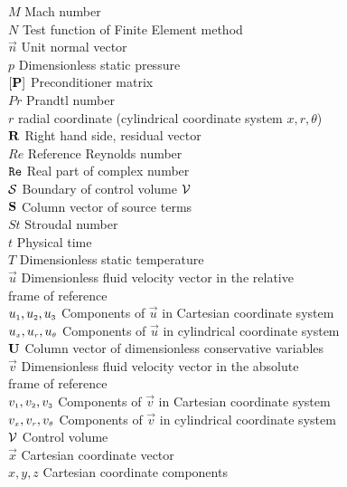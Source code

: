 \begin{tabbing}
$M$                    \> Mach number\\
$N$                    \> Test function of Finite Element method\\
$\vec{n}$              \> Unit normal vector\\
$p$                    \> Dimensionless static pressure\\
$\left[{\bf P}\right]$ \> Preconditioner matrix\\
$Pr$                   \> Prandtl number\\
$r$                    \> radial coordinate (cylindrical coordinate system $x, r, \theta$)\\
${\bf R}$              \> Right hand side, residual vector\\
$Re$                   \> Reference Reynolds number\\
${\tt Re}$             \> Real part of complex number\\
$\cal{S}$              \> Boundary of control volume $\cal{V}$\\
${\bf S}$              \> Column vector of source terms\\
$St$                   \> Stroudal number\\
$t$                    \> Physical time\\
$T$                    \> Dimensionless static temperature\\
$\vec{u}$              \> Dimensionless fluid velocity vector in the relative\\
                       \> frame of reference\\
$u_{\mbox{\tiny $1$}}, u_{\mbox{\tiny $2$}}, u_{\mbox{\tiny $3$}}$ \> Components of $\vec{u}$ in Cartesian coordinate system\\
$u_{\mbox{\tiny $x$}}, u_{\mbox{\tiny $r$}}, u_{\mbox{\tiny $\theta$}}$ \> Components of $\vec{u}$ in cylindrical coordinate system\\
$\bf U$                \> Column vector of dimensionless conservative variables\\
$\vec{v}$              \> Dimensionless fluid velocity vector in the absolute\\
                       \> frame of reference\\
$v_{\mbox{\tiny $1$}}, v_{\mbox{\tiny $2$}}, v_{\mbox{\tiny $3$}}$ \> Components of $\vec{v}$ in Cartesian coordinate system\\
$v_{\mbox{\tiny $x$}}, v_{\mbox{\tiny $r$}}, v_{\mbox{\tiny $\theta$}}$ \> Components of $\vec{v}$ in cylindrical coordinate system\\
$\cal{V}$              \> Control volume\\
$\vec{x}$              \> Cartesian coordinate vector\\
$x, y, z$              \> Cartesian coordinate components
\end{tabbing}
%
